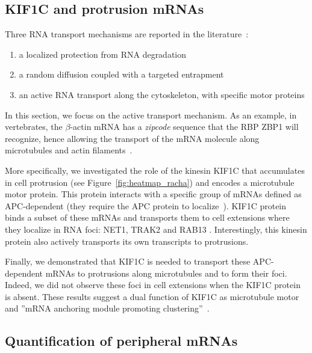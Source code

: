\subsection{KIF1C and protrusion mRNAs}
\label{subsec:introduction_protrusion}

Three \ac{RNA} transport mechanisms are reported in the literature~\cite{Medioni_2012, Bovaird_2018}:

\begin{enumerate}
	\setlength\itemsep{0.1em}
	\item a localized protection from \ac{RNA} degradation
	\item a random diffusion coupled with a targeted entrapment
	\item an active \ac{RNA} transport along the cytoskeleton, with specific motor proteins
\end{enumerate}

\noindent
In this section, we focus on the active transport mechanism.
As an example, in vertebrates, the $\beta$-actin \ac{mRNA} has a \emph{zipcode} sequence that the \ac{RBP} ZBP1 will recognize, hence allowing the transport of the \ac{mRNA} molecule along microtubules and actin filaments~\cite{Oleynikov_2003}.

More specifically, we investigated the role of the kinesin KIF1C that accumulates in cell protrusion (see Figure~\ref{fig:heatmap_racha}) and encodes a microtubule motor protein.
This protein interacts with a specific group of \ac{mRNA}s defined as APC-dependent (they require the APC protein to localize~\cite{wang_extracellular_2017}).
KIF1C protein binds a subset of these \ac{mRNA}s and transports them to cell extensions where they localize in RNA foci: NET1, TRAK2 and RAB13 .
Interestingly, this kinesin protein also actively transports its own transcripts to protrusions.

Finally, we demonstrated that KIF1C is needed to transport these APC-dependent \ac{mRNA}s to protrusions along microtubules and to form their foci.
Indeed, we did not observe these foci in cell extensions when the KIF1C protein is absent.
These results suggest a dual function of KIF1C as microtubule motor and ''\ac{mRNA} anchoring module promoting clustering''~\cite{pichon_kinesin_2021}.

\subsection{Quantification of peripheral mRNAs}
\label{subsec:materials_results_protrusion}

